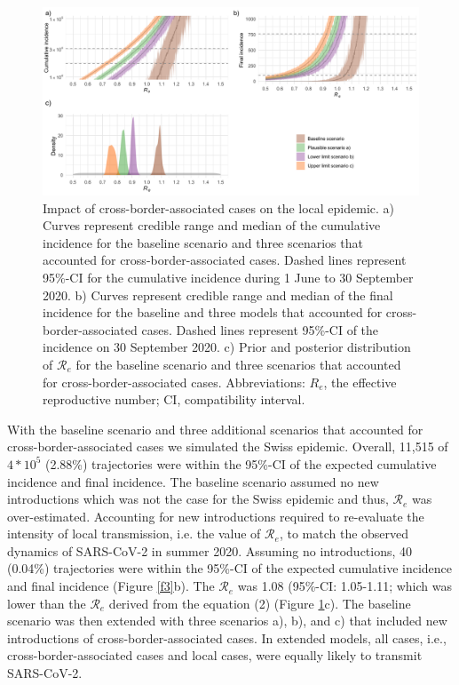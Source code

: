 \documentclass[10pt, a4paper, twoside]{article}
\begin{document}
\begin{multicols}{2}
\begin{figure}
\centering
\includegraphics[scale=0.15]{Figure2_2021-06-02.png}
\caption{Impact of cross-border-associated cases on the local epidemic.
a) Curves represent credible range and median of the cumulative incidence for the baseline scenario and three scenarios that accounted for cross-border-associated cases.
Dashed lines represent 95\%-CI for the cumulative incidence during 1 June to 30 September 2020.
b) Curves represent credible range and median of the final incidence for the baseline and three models that accounted for cross-border-associated cases.
Dashed lines represent 95\%-CI of the incidence on 30 September 2020.
c) Prior and posterior distribution of $\mathcal{R}_e$ for the baseline scenario and three scenarios that accounted for cross-border-associated cases.
Abbreviations: $R_e$, the effective reproductive number; CI, compatibility interval.}

\label{f2}
\end{figure}

With the baseline scenario and three additional scenarios that accounted for cross-border-associated cases we simulated the Swiss epidemic.
Overall, 11,515 of $4*10^5$ (2.88\%) trajectories were within the 95\%-CI of the expected cumulative incidence and final incidence.
The baseline scenario assumed no new introductions which was not the case for the Swiss epidemic and thus, $\mathcal{R}_e$ was over-estimated.
Accounting for new introductions required to re-evaluate the intensity of local transmission, i.e. the value of $\mathcal{R}_e$, to match the observed dynamics of SARS-CoV-2 in summer 2020.
Assuming no introductions, 40 (0.04\%) trajectories were within the 95\%-CI of the expected cumulative incidence and final incidence (Figure \ref{f3}b).
The $\mathcal{R}_e$ was 1.08 (95\%-CI: 1.05-1.11; which was lower than the $\mathcal{R}_e$ derived from the equation (2) (Figure \ref{f2}c).
The baseline scenario was then extended with three scenarios a), b), and c) that included new introductions of cross-border-associated cases.
In extended models, all cases, i.e., cross-border-associated cases and local cases, were equally likely to transmit SARS-CoV-2.


\end{multicols}
\end{document}
